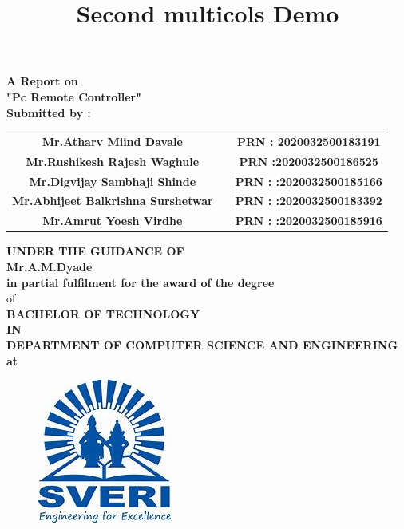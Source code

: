 \documentclass[12pt]{article}
\title{Second multicols Demo}
\begin{document}
 \begin{center}
 \large \textbf {A Report on}\\[2mm]
 \LARGE \textbf {"Pc Remote Controller"}\\[7mm]
 
 \textbf{Submitted by :}\\[2mm]
 \end{center}
 
 
 \begin{tabular}{ c c c } 
 \textbf{Mr.Atharv Miind Davale} & \hspace{1in} & \textbf{ PRN :  2020032500183191} \\ [1mm] 
 \textbf {Mr.Rushikesh Rajesh Waghule} & \hspace{1in} & \textbf{PRN :2020032500186525}\\[1mm]
 \textbf{ Mr.Digvijay Sambhaji Shinde } & \hspace{1in}  & \textbf{PRN : :2020032500185166}\\[1mm]
\textbf{ Mr.Abhijeet Balkrishna Surshetwar} & \hspace{1in}  & \textbf{PRN : :2020032500183392}\\[1mm]
\textbf{ Mr.Amrut Yoesh Virdhe} & \hspace{1in}  & \textbf{PRN : :2020032500185916}\\[7mm] 
\end{tabular} 
 
 
 
 \begin{center}
 \large \textbf {UNDER THE GUIDANCE OF }\\[2mm]
 \large \textbf {Mr.A.M.Dyade}\\[7mm]
 \textbf {in partial fulfilment for the award of the degree} \\[2mm] of \\[2mm]
 
 \large \textbf {BACHELOR OF TECHNOLOGY}\\[2mm]
 \textbf {IN}\\[2mm]
 \textbf {DEPARTMENT OF COMPUTER SCIENCE AND ENGINEERING}\\
 \textbf {at}
 \end{center}
 
 \begin{figure}[h]
 \centering
 \includegraphics[scale=1]{sveri2logo}
\end{figure} 
\end{document}
